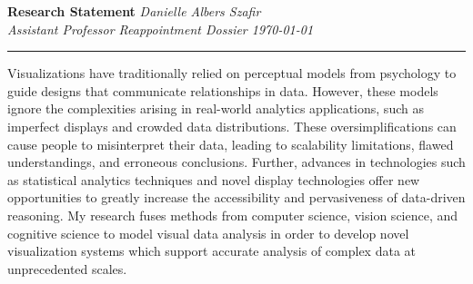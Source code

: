 \documentclass[11pt]{article}
\begin{document}
\setlength{\belowcaptionskip}{-10pt}

\thispagestyle{fancy}

\textbf{\Large Research Statement}
{\hspace{220pt}\emph{Danielle Albers Szafir\\Assistant Professor Reappointment Dossier \hspace{185pt}\today} \vspace{3pt}}
\hrule


Visualizations have traditionally relied on perceptual models from psychology to guide designs that communicate relationships in data.  However, these models ignore the complexities arising in real-world analytics applications, such as imperfect displays and crowded data distributions. These oversimplifications can cause people to misinterpret their data, leading to scalability limitations, flawed understandings, and erroneous conclusions. Further, advances in technologies such as statistical analytics techniques and novel display technologies offer new opportunities 
to greatly increase the accessibility and pervasiveness of data-driven reasoning. My research fuses methods from computer science, vision science, and cognitive science to model visual data analysis in order to develop novel visualization systems which support accurate analysis of complex data at unprecedented scales.
\end{document}
